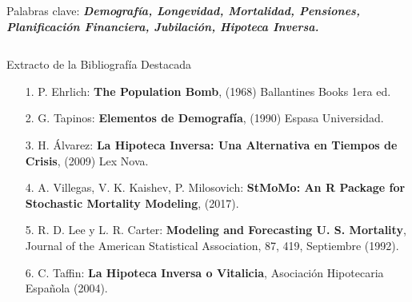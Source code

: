 \documentclass[]{beamer}
\begin{document}
\begin{frame}{\vspace{1ex}\hfill Palabras clave: \bfseries \textit{Demograf\'ia, Longevidad, Mortalidad, Pensiones, Planificaci\'on Financiera, Jubilaci\'on, Hipoteca Inversa.}}
\begin{columns}[t]
		\vspace{-0.45cm}
		
			\begin{block}{Extracto de la Bibliograf\'ia Destacada}\vspace{-0.4cm}
				\begin{itemize}
				\item[1.] P. Ehrlich: \textbf{The Population Bomb}, (1968) Ballantines Books 1era ed. 
				\item[2.] G. Tapinos: \textbf{Elementos de Demografía}, (1990) Espasa Universidad.
				\item[3.] H. \'Alvarez: \textbf{La Hipoteca Inversa: Una Alternativa en Tiempos de Crisis}, (2009) Lex Nova.
				\item[4.] A. Villegas, V. K. Kaishev, P. Milosovich: \textbf{StMoMo: An R Package for Stochastic Mortality Modeling}, (2017).
				\item[5.] R. D. Lee y L. R. Carter: \textbf{Modeling and Forecasting U. S. Mortality}, Journal of the American Statistical Association, 87, 419, Septiembre (1992).
				\item[6.] C. Taffin: \textbf{La Hipoteca Inversa o Vitalicia}, Asociaci\'on Hipotecaria Espa\~nola (2004).
				\end{itemize}\vspace{-0.3cm}
				\end{block}
			
	\end{columns}
\end{frame}
\end{document}
